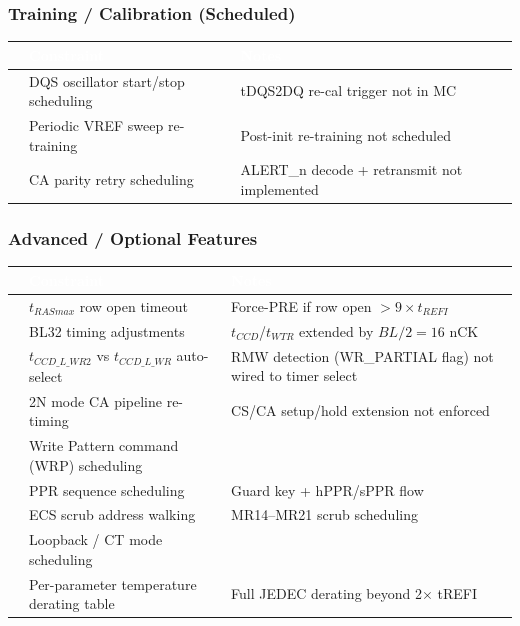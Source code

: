 \documentclass[11pt,a4paper]{article}
\newcommand{\THead}[1]{\cellcolor{navy}\textcolor{white}{\small\textbf{#1}}}
\newcommand{\RA}{\rowcolor{lgray}}
\newcommand{\RB}{\rowcolor{sky!30}}
\newcommand{\xmark}{\textcolor{red}{\ding{55}}}
\begin{document}
\subsubsection*{Training / Calibration (Scheduled)}
\begin{center}
\begin{tabularx}{\linewidth}{@{} c l X @{}}
\toprule
\THead{} & \THead{Constraint} & \THead{Notes} \\
\midrule
\RA\xmark & DQS oscillator start/stop scheduling &
  tDQS2DQ re-cal trigger not in MC \\
\RB\xmark & Periodic VREF sweep re-training &
  Post-init re-training not scheduled \\
\RA\xmark & CA parity retry scheduling &
  ALERT\_n decode + retransmit not implemented \\
\bottomrule
\end{tabularx}
\end{center}

\subsubsection*{Advanced / Optional Features}
\begin{center}
\begin{tabularx}{\linewidth}{@{} c l X @{}}
\toprule
\THead{} & \THead{Constraint} & \THead{Notes} \\
\midrule
\RA\xmark & $t_{RASmax}$ row open timeout &
  Force-PRE if row open $>9\times t_{REFI}$ \\
\RB\xmark & BL32 timing adjustments &
  $t_{CCD}$/$t_{WTR}$ extended by $BL/2=16$ nCK \\
\RA\xmark & $t_{CCD\_L\_WR2}$ vs $t_{CCD\_L\_WR}$ auto-select &
  RMW detection (WR\_PARTIAL flag) not wired to timer select \\
\RB\xmark & 2N mode CA pipeline re-timing &
  CS/CA setup/hold extension not enforced \\
\RA\xmark & Write Pattern command (WRP) scheduling & \\
\RB\xmark & PPR sequence scheduling &
  Guard key + hPPR/sPPR flow \\
\RA\xmark & ECS scrub address walking &
  MR14--MR21 scrub scheduling \\
\RB\xmark & Loopback / CT mode scheduling & \\
\RA\xmark & Per-parameter temperature derating table &
  Full JEDEC derating beyond 2$\times$ tREFI \\
\bottomrule
\end{tabularx}
\end{center}
\end{document}
